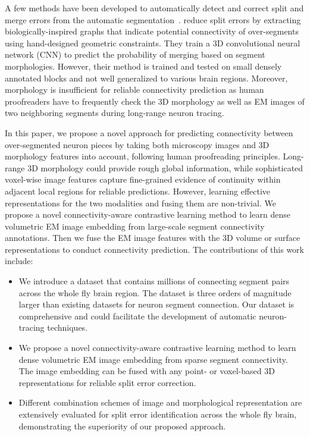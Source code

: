 A few methods have been developed to automatically detect and correct split and merge errors from the automatic segmentation~\cite{matejek2019biologically,zung2017error,VJain-MICCAI-2020}. 
\citet{matejek2019biologically} reduce split errors by extracting biologically-inspired graphs that indicate potential connectivity of over-segments using hand-designed geometric constraints. They train a 3D convolutional neural network (CNN) to predict the probability of merging based on segment morphologies. However, their method is trained and tested on small densely annotated blocks and not well generalized to various brain regions. 
Moreover, morphology is insufficient for reliable connectivity prediction as human proofreaders have to frequently check the 3D morphology as well as EM images of two neighboring segments during long-range neuron tracing.
 


In this paper, we propose a novel approach for predicting connectivity between over-segmented neuron pieces by taking both microscopy images and 3D morphology features into account, following human proofreading principles. 
Long-range 3D morphology could provide rough global information, while sophisticated voxel-wise image features capture fine-grained evidence of continuity within adjacent local regions for reliable predictions.
However, learning effective representations for the two modalities and fusing them are non-trivial. 
We propose a novel connectivity-aware contrastive learning method to learn dense volumetric EM image embedding from large-scale segment connectivity annotations.  
Then we fuse the EM image features with the 3D volume or surface representations to conduct connectivity prediction. 
%
The contributions of this work include:
\begin{itemize}
  \item We introduce a dataset that contains millions of connecting segment pairs across the whole fly brain region. The dataset is three orders of magnitude larger than existing datasets for neuron segment connection. Our dataset is comprehensive and could facilitate the development of automatic neuron-tracing techniques.
  
  \item We propose a novel connectivity-aware contrastive learning method
to learn dense volumetric EM image embedding from sparse segment connectivity. The image embedding can be fused with any point- or voxel-based 3D representations for reliable split error correction.

  \item Different combination schemes of image and morphological representation are extensively evaluated for split error identification across the whole fly brain, demonstrating the superiority of our proposed approach.
\end{itemize}


